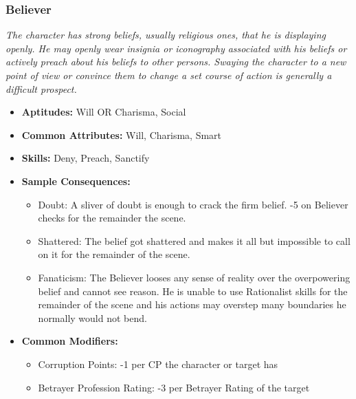 \subsubsection{Believer}\label{Believer}
\textit{The character has strong beliefs, usually religious ones, that he is displaying openly.
He may openly wear insignia or iconography associated with his beliefs or actively preach about his beliefs to other persons.
Swaying the character to a new point of view or convince them to change a set course of action is generally a difficult prospect.}
\begin{itemize}
	\item \textbf{Aptitudes:} Will OR Charisma, Social
	\item \textbf{Common Attributes:} Will, Charisma, Smart
	\item \textbf{Skills:} Deny, Preach, Sanctify
	\item \textbf{Sample Consequences:} 
	\begin{itemize}
		\item Doubt: A sliver of doubt is enough to crack the firm belief. -5 on Believer checks for the remainder the scene.
		\item Shattered: The belief got shattered and makes it all but impossible to call on it for the remainder of the scene.
		\item Fanaticism: The Believer looses any sense of reality over the overpowering belief and cannot see reason. He is unable to use Rationalist skills for the remainder of the scene and his actions may overstep many boundaries he normally would not bend.
	\end{itemize}
	\item \textbf{Common Modifiers:}
	\begin{itemize}
		\item Corruption Points: -1 per CP the character or target has
		\item Betrayer Profession Rating: -3 per Betrayer Rating of the target
	\end{itemize}
\end{itemize}

